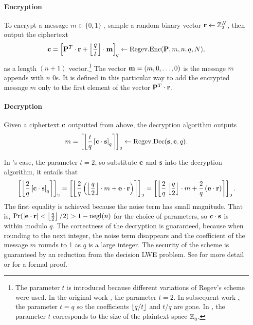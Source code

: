 \documentclass[../main.tex]{subfiles}
\begin{document}
\paragraph{Encryption} To encrypt a message $m \in \{0, 1\}$ , sample a random binary vector $\mathbf{r} \leftarrow \mathbb{Z}^N_2$, then output the ciphertext 
\begin{align*}
    \mathbf{c}=\left[{\mathbf{P}^T \cdot \mathbf{r} + \left\lfloor{\frac{q}{t}}\right\rfloor \cdot \mathbf{m}}\right]_q \leftarrow \text{Regev}.\text{Enc}(\mathbf{P},m,n,q,N),
\end{align*}
as a length $(n+1)$ vector.\footnote{The parameter $t$ is introduced because different variations of Regev's scheme were used. In the original work \cite{regev2009lattices}, the parameter $t=2$. In subsequent work \cite{brakerski2014efficient,brakerski2014leveled,brakerski2012fully}, the parameter $t=q$ so the coefficients $\left\lfloor{q/t}\right\rfloor$ and $t/q$ are gone. In \cite{fan2012somewhat}, the parameter $t$ corresponds to the size of the plaintext space $\mathbb{Z}_q$.}  The vector $\mathbf{m}=(m, 0, \dots, 0)$ is the message $m$ appends with $n$ 0s. It is defined in this particular way to add the encrypted message $m$ only to the first element of the vector $\mathbf{P}^T \cdot \mathbf{r}$.
    
\paragraph{Decryption} Given a ciphertext $\mathbf{c}$ outputted from above, the decryption algorithm outputs  
\begin{align*}
    m = \left[{\left\lfloor{\frac{t}{q}\left[{\mathbf{c} \cdot \mathbf{s}}\right]_q}\right\rceil}\right]_2 \leftarrow \text{Regev}.\text{Dec}(\mathbf{s},\mathbf{c},q).
\end{align*}

In \cite{regev2009lattices}'s case, the parameter $t=2$, so substitute $\mathbf{c}$ and $\mathbf{s}$ into the decryption algorithm, it entails that 
\begin{align*}
    \left[{\left\lfloor{\frac{2}{q}\left[{\mathbf{c} \cdot \mathbf{s}}\right]_q}\right\rceil}\right]_2 
    = \left[{\left\lfloor{\frac{2}{q} \left({\left\lfloor{\frac{q}{2}}\right\rfloor \cdot m + \mathbf{e} \cdot \mathbf{r}}\right)}\right\rceil}\right]_2
    = \left[{\left\lfloor{\frac{2}{q} \left\lfloor{\frac{q}{2}}\right\rfloor \cdot m + \frac{2}{q} \left({\mathbf{e} \cdot \mathbf{r}}\right)}\right\rceil}\right]_2.
\end{align*}
The first equality is achieved because the noise term has small magnitude. That is, $\text{Pr}(|\mathbf{e} \cdot \mathbf{r}| < \left\lfloor{\frac{q}{2}}\right\rfloor/2) > 1 - \text{negl}(n)$ for the choice of parameters, so $\mathbf{c} \cdot \mathbf{s}$ is within modulo $q$. The correctness of the decryption is guaranteed, because when rounding to the next integer, the noise term disappears and the coefficient of the message $m$ rounds to 1 as $q$ is a large integer. The security of the scheme is guaranteed by an reduction from the decision LWE problem. See  for more detail or \cite{regev2009lattices} for a formal proof. 
\end{document}
